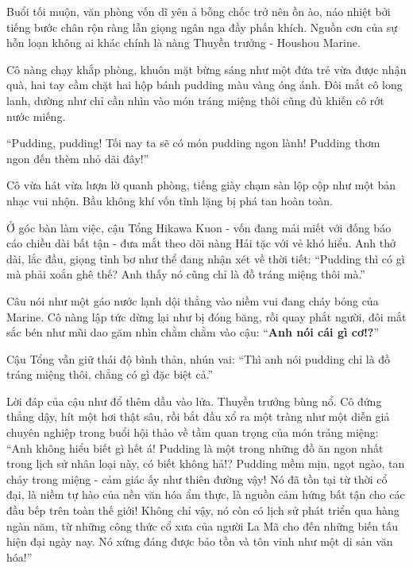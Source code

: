 \documentclass[../main.tex]{subfiles}
\begin{document}

Buổi tối muộn, văn phòng \hll vốn dĩ yên ả bỗng chốc trở nên ồn ào, náo nhiệt bởi tiếng bước chân rộn ràng lẫn giọng ngân nga đầy phấn khích. Nguồn cơn của sự hỗn loạn không ai khác chính là nàng Thuyền trưởng - Houshou Marine.

Cô nàng chạy khắp phòng, khuôn mặt bừng sáng như một đứa trẻ vừa được nhận quà, hai tay cầm chặt hai hộp bánh pudding màu vàng óng ánh. Đôi mắt cô long lanh, dường như chỉ cần nhìn vào món tráng miệng thôi cũng đủ khiến cô rớt nước miếng.

``Pudding, pudding! Tối nay ta sẽ có món pudding ngon lành! Pudding thơm ngon đến thèm nhỏ dãi đây!''

Cô vừa hát vừa lượn lờ quanh phòng, tiếng giày chạm sàn lộp cộp như một bản nhạc vui nhộn. Bầu không khí vốn tĩnh lặng bị phá tan hoàn toàn.


Ở góc bàn làm việc, cậu Tổng Hikawa Kuon - vốn đang mải miết với đống báo cáo chiều dài bất tận - đưa mắt theo dõi nàng Hải tặc với vẻ khó hiểu. Anh thở dài, lắc đầu, giọng tỉnh bơ như thể đang nhận xét về thời tiết: ``Pudding thì có gì mà phải xoắn ghê thế? Anh thấy nó cũng chỉ là đồ tráng miệng thôi mà.''

Câu nói như một gáo nước lạnh dội thẳng vào niềm vui đang cháy bỏng của Marine. Cô nàng lập tức dừng lại như bị đóng băng, rồi quay phắt người, đôi mắt sắc bén như mũi dao găm nhìn chằm chằm vào cậu: ``\textbf{Anh nói cái gì cơ!?}''

Cậu Tổng vẫn giữ thái độ bình thản, nhún vai: ``Thì anh nói pudding chỉ là đồ tráng miệng thôi, chẳng có gì đặc biệt cả.''

Lời đáp của cậu như đổ thêm dầu vào lửa. Thuyền trưởng bùng nổ. Cô đứng thẳng dậy, hít một hơi thật sâu, rồi bắt đầu xổ ra một tràng như một diễn giả chuyên nghiệp trong buổi hội thảo về tầm quan trọng của món tráng miệng: ``Anh không hiểu biết gì hết á! Pudding là một trong những đồ ăn ngon nhất trong lịch sử nhân loại này, có biết không hả!? Pudding mềm mịn, ngọt ngào, tan chảy trong miệng - cảm giác ấy như thiên đường vậy! Nó đã tồn tại từ thời cổ đại, là niềm tự hào của nền văn hóa ẩm thực, là nguồn cảm hứng bất tận cho các đầu bếp trên toàn thế giới! Không chỉ vậy, nó còn có lịch sử phát triển qua hàng ngàn năm, từ những công thức cổ xưa của người La Mã cho đến những biến tấu hiện đại ngày nay. Nó xứng đáng được bảo tồn và tôn vinh như một di sản văn hóa!''
\end{document}
